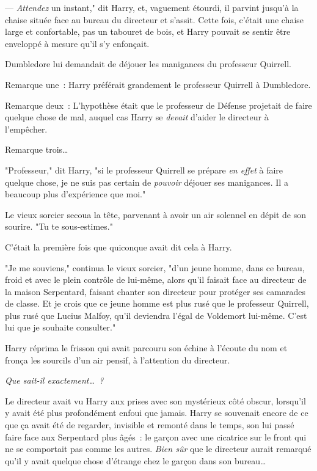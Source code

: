 --- \emph{Attendez} un instant," dit Harry, et, vaguement étourdi, il parvint jusqu'à la chaise située face au bureau du directeur et s'assit. Cette fois, c'était une chaise large et confortable, pas un tabouret de bois, et Harry pouvait se sentir être enveloppé à mesure qu'il s'y enfonçait.

Dumbledore lui demandait de déjouer les manigances du professeur Quirrell.

Remarque une~: Harry préférait grandement le professeur Quirrell à Dumbledore.

Remarque deux~: L'hypothèse était que le professeur de Défense projetait de faire quelque chose de mal, auquel cas Harry se \emph{devait} d'aider le directeur à l'empêcher.

Remarque trois…

"Professeur," dit Harry, "si le professeur Quirrell se prépare \emph{en effet} à faire quelque chose, je ne suis pas certain de \emph{pouvoir} déjouer ses manigances. Il a beaucoup plus d'expérience que moi."

Le vieux sorcier secoua la tête, parvenant à avoir un air solennel en dépit de son sourire. "Tu te sous-estimes."

C'était la première fois que quiconque avait dit cela à Harry.

"Je me souviens," continua le vieux sorcier, "d'un jeune homme, dans ce bureau, froid et avec le plein contrôle de lui-même, alors qu'il faisait face au directeur de la maison Serpentard, faisant chanter son directeur pour protéger ses camarades de classe. Et je crois que ce jeune homme est plus rusé que le professeur Quirrell, plus rusé que Lucius Malfoy, qu'il deviendra l'égal de Voldemort lui-même. C'est lui que je souhaite consulter."

Harry réprima le frisson qui avait parcouru son échine à l'écoute du nom et fronça les sourcils d'un air pensif, à l'attention du directeur.

\emph{Que sait-il exactement…~?}

Le directeur avait vu Harry aux prises avec son mystérieux côté obscur, lorsqu'il y avait été plus profondément enfoui que jamais. Harry se souvenait encore de ce que ça avait été de regarder, invisible et remonté dans le temps, son lui passé faire face aux Serpentard plus âgés~: le garçon avec une cicatrice sur le front qui ne se comportait pas comme les autres. \emph{Bien sûr} que le directeur aurait remarqué qu'il y avait quelque chose d'étrange chez le garçon dans son bureau…

